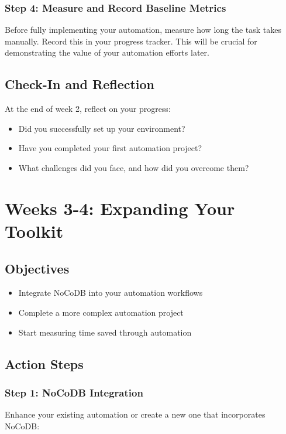 
\subsubsection{Step 4: Measure and Record Baseline Metrics}
Before fully implementing your automation, measure how long the task takes manually. Record this in your progress tracker. This will be crucial for demonstrating the value of your automation efforts later.

\subsection{Check-In and Reflection}
At the end of week 2, reflect on your progress:

\begin{itemize}
    \item Did you successfully set up your environment?
    \item Have you completed your first automation project?
    \item What challenges did you face, and how did you overcome them?
\end{itemize}

\section{Weeks 3-4: Expanding Your Toolkit}

\subsection{Objectives}
\begin{itemize}
    \item Integrate NoCoDB into your automation workflows
    \item Complete a more complex automation project
    \item Start measuring time saved through automation
\end{itemize}

\subsection{Action Steps}

\subsubsection{Step 1: NoCoDB Integration}
Enhance your existing automation or create a new one that incorporates NoCoDB:

